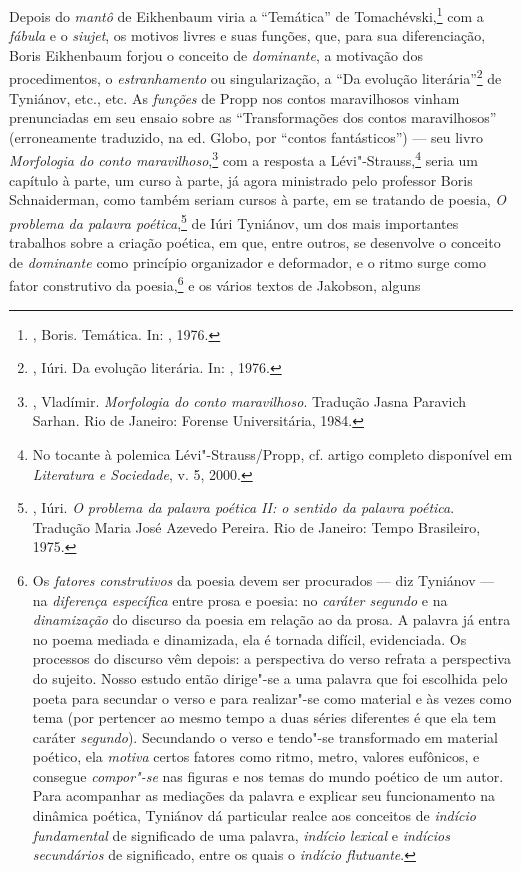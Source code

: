 Depois do \emph{mantô} de Eikhenbaum viria a ``Temática'' de
Tomachévski,\footnote{, Boris. Temática. In:
 , 1976.} com a \emph{fábula} e o \emph{siujet}, os motivos livres e
suas funções, que, para sua diferenciação, Boris Eikhenbaum forjou o conceito
de \emph{dominante}, a motivação dos procedimentos, o \emph{estranhamento} ou
singularização, a ``Da evolução literária''\footnote{, Iúri. Da evolução literária.
 In: , 1976.} de Tyniánov, etc., etc. As
\emph{funções} de Propp nos contos maravilhosos vinham prenunciadas
em seu ensaio sobre as ``Transformações dos contos maravilhosos''
(erroneamente traduzido, na ed. Globo, por ``contos fantásticos'') --- seu livro
\emph{Morfologia do conto maravilhoso},\footnote{, 
Vladímir. \emph{Morfologia do conto maravilhoso}. Tradução Jasna Paravich Sarhan. Rio de Janeiro:
 Forense Universitária, 1984.} com a resposta a
Lévi"-Strauss,\footnote{No tocante à polemica Lévi"-Strauss/Propp,
 cf. artigo completo disponível em \emph{Literatura e Sociedade}, v. 5, 2000.} seria um capítulo à parte, um curso à
parte, já agora ministrado pelo professor Boris Schnaiderman, como também seriam cursos
à parte, em se tratando de poesia, \emph{O problema da palavra poética},\footnote{, Iúri. 
\emph{O problema da palavra poética II: o sentido da palavra poética}.
 Tradução Maria José Azevedo Pereira. Rio de Janeiro: Tempo Brasileiro,
 1975.}
de Iúri Tyniánov, um dos mais importantes trabalhos sobre a
criação poética, em que, entre outros, se desenvolve o conceito de
\emph{dominante} como princípio organizador e deformador, e o ritmo surge como
fator construtivo da poesia,\footnote{Os \emph{fatores 
construtivos} da poesia devem ser procurados --- diz Tyniánov --- na 
\emph{diferença específica} entre prosa e poesia: no \emph{caráter 
segundo} e na \emph{dinamização} do discurso da poesia em relação ao 
da prosa. A palavra já entra no poema mediada e dinamizada, ela é 
tornada difícil, evidenciada. Os processos do discurso vêm depois:
 a perspectiva do verso refrata a perspectiva do sujeito. Nosso estudo 
então dirige"-se a uma palavra que foi escolhida pelo poeta para 
secundar o verso e para realizar"-se como material e às vezes como
 tema (por pertencer ao mesmo tempo a duas séries diferentes é que
 ela tem caráter \emph{segundo}). Secundando o verso e tendo"-se
transformado em material poético, ela \emph{motiva} certos fatores 
como ritmo, metro, valores eufônicos, e consegue \emph{compor"-se} 
nas figuras e nos temas do mundo poético de um autor. Para acompanhar
 as mediações da palavra e explicar seu funcionamento na dinâmica
 poética, Tyniánov dá particular realce aos conceitos de \emph{indício
 fundamental} de significado de uma palavra, \emph{indício lexical}
 e \emph{indícios secundários} de significado, entre os quais o
 \emph{indício flutuante}.} e os vários textos de Jakobson, alguns
